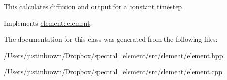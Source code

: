 This calculates diffusion and output for a constant timestep. 



 

Implements \hyperlink{classelement_1_1element_a4addb59e38072d5a99d3d9a9de9c225e}{element\-::element}.



The documentation for this class was generated from the following files\-:\begin{DoxyCompactItemize}
\item 
/\-Users/justinbrown/\-Dropbox/spectral\-\_\-element/src/element/\hyperlink{element_8hpp}{element.\-hpp}\item 
/\-Users/justinbrown/\-Dropbox/spectral\-\_\-element/src/element/\hyperlink{element_8cpp}{element.\-cpp}\end{DoxyCompactItemize}

